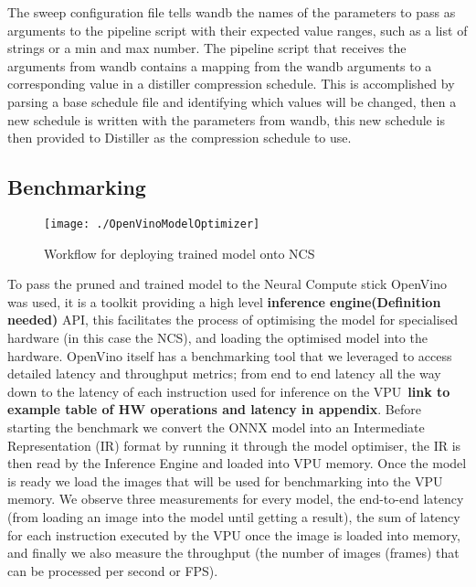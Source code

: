 \documentclass[../Dissertation.tex]{subfiles}
\begin{document}
The sweep configuration file tells wandb the names of the parameters to pass as arguments to the pipeline script with their expected value ranges, such as a list of strings or a min and max number. 
The pipeline script that receives the arguments from wandb contains a mapping from the wandb arguments to a corresponding value in a distiller compression schedule.
This is accomplished by parsing a base schedule file and identifying which values will be changed, then a new schedule is written with the parameters from wandb, this new schedule is then provided to Distiller as the compression schedule to use.



\subsection{Benchmarking}

\begin{figure}[H]
	\centering
	\texttt{[image: ./OpenVinoModelOptimizer]}
	\caption{Workflow for deploying trained model onto NCS~\autocite{ModelOptimizerDeveloper}}
	\label{fig:OpenVinoWorkflow}
\end{figure}


To pass the pruned and trained model to the Neural Compute stick OpenVino was used, it is a toolkit providing a high level \textbf{inference engine(\color{red}Definition needed)} API, this facilitates the process of optimising the model for specialised hardware (in this case the NCS), and loading the optimised model into the hardware. 
OpenVino itself has a benchmarking tool that we leveraged to access detailed latency and throughput metrics; from end to end latency all the way down to the latency of each instruction used for inference on the VPU~\textbf{\color{red}link to example table of HW operations and latency in appendix}. 
Before starting the benchmark we convert the ONNX model into an Intermediate Representation (IR) format by running it through the model optimiser, the IR is then read by the Inference Engine and loaded into VPU memory.
Once the model is ready we load the images that will be used for benchmarking into the VPU memory.
We observe three measurements for every model, the end-to-end latency (from loading an image into the model until getting a result), the sum of latency for each instruction executed by the VPU once the image is loaded into memory, and finally we also measure the throughput (the number of images (frames) that can be processed per second or FPS).
\end{document}
